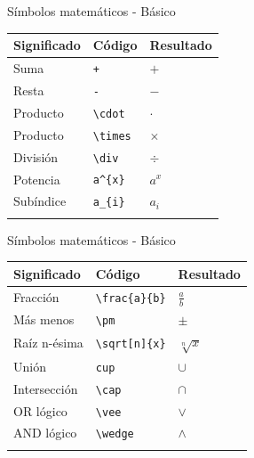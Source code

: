\documentclass[
  ignorenonframetext,
]{beamer}
\begin{document}
\begin{frame}[fragile]{Símbolos matemáticos - Básico}
\label{suxedmbolos-matemuxe1ticos---buxe1sico}
\begin{longtable}[]{@{}lll@{}}
\toprule\noalign{}
Significado & Código & Resultado \\
\midrule\noalign{}
\endhead
Suma & \texttt{+} & \(+\) \\
Resta & \texttt{-} & \(-\) \\
Producto & \texttt{\textbackslash{}cdot} & \(\cdot\) \\
Producto & \texttt{\textbackslash{}times} & \(\times\) \\
División & \texttt{\textbackslash{}div} & \(\div\) \\
Potencia & \texttt{a\^{}\{x\}} & \(a^{x}\) \\
Subíndice & \texttt{a\_\{i\}} & \(a_{i}\) \\
\bottomrule\noalign{}
\end{longtable}
\end{frame}

\begin{frame}[fragile]{Símbolos matemáticos - Básico}
\label{suxedmbolos-matemuxe1ticos---buxe1sico-1}
\begin{longtable}[]{@{}lll@{}}
\toprule\noalign{}
Significado & Código & Resultado \\
\midrule\noalign{}
\endhead
Fracción & \texttt{\textbackslash{}frac\{a\}\{b\}} & \(\frac{a}{b}\) \\
Más menos & \texttt{\textbackslash{}pm} & \(\pm\) \\
Raíz n-ésima & \texttt{\textbackslash{}sqrt{[}n{]}\{x\}} &
\(\sqrt[n]{x}\) \\
Unión & \texttt{cup} & \(\cup\) \\
Intersección & \texttt{\textbackslash{}cap} & \(\cap\) \\
OR lógico & \texttt{\textbackslash{}vee} & \(\vee\) \\
AND lógico & \texttt{\textbackslash{}wedge} & \(\wedge\) \\
\bottomrule\noalign{}
\end{longtable}
\end{frame}
\end{document}
